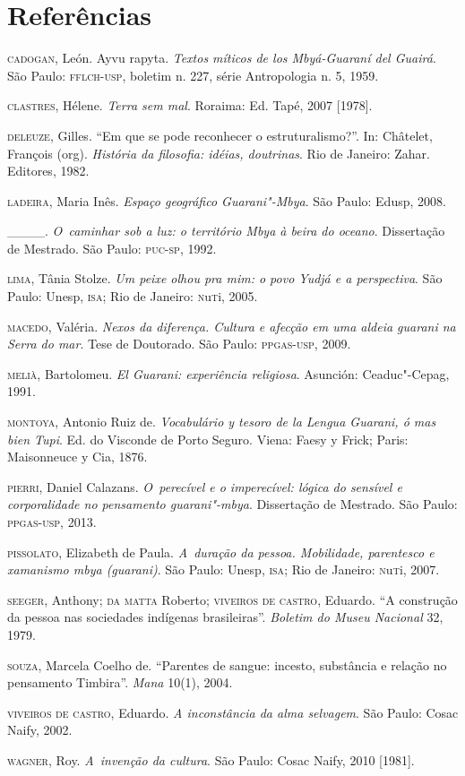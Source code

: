\section{Referências}

\begin{Parskip}
\textsc{cadogan}, León. Ayvu rapyta. \emph{Textos míticos de los Mbyá-Guaraní del
Guairá}. São Paulo: \textsc{fflch}-\textsc{usp}, boletim n. 227, série Antropologia n. 5,
1959.

\textsc{clastres}, Hélene. \emph{Terra sem mal}. Roraima: Ed. Tapé, 2007 [1978].

\textsc{deleuze}, Gilles. ``Em que se pode reconhecer o estruturalismo?''.
In: Châtelet, François (org). \emph{História da filosofia: idéias,
doutrinas}. Rio de Janeiro: Zahar. Editores, 1982.

\textsc{ladeira}, Maria Inês. \emph{Espaço geográfico Guarani"-Mbya}. São Paulo:
Edusp, 2008.

\_\_\_\_. \emph{O~caminhar sob a luz: o território Mbya à beira do oceano}. 
Dissertação de Mestrado. São Paulo: \textsc{puc}-\textsc{sp}, 1992.

\textsc{lima}, Tânia Stolze. \emph{Um peixe olhou pra mim: o povo Yudjá e a
perspectiva}. São Paulo: Unesp, \textsc{isa}; Rio de Janeiro: \textsc{n}u\textsc{t}i, 2005.

\textsc{macedo}, Valéria. \emph{Nexos da diferença. Cultura e afecção em uma
aldeia guarani na Serra do mar}. Tese de Doutorado. São Paulo:
\textsc{ppgas}-\textsc{usp}, 2009.

\textsc{melià}, Bartolomeu. \emph{El Guarani: experiência religiosa}. Asunción:
Ceaduc"-Cepag, 1991.

\textsc{montoya}, Antonio Ruiz de. \emph{Vocabulário y tesoro de la Lengua
Guarani, ó mas bien Tupi}. Ed. do Visconde de Porto Seguro. Viena: Faesy
y Frick; Paris: Maisonneuce y Cia, 1876.

\textsc{pierri}, Daniel Calazans. \emph{O~perecível e o imperecível: lógica do
sensível e corporalidade no pensamento guarani"-mbya}. Dissertação de
Mestrado. São Paulo: \textsc{ppgas}-\textsc{usp}, 2013.

\textsc{pissolato}, Elizabeth de Paula. \emph{A~duração da pessoa. Mobilidade,
parentesco e xamanismo mbya (guarani)}. São Paulo: Unesp, \textsc{isa}; Rio de
Janeiro: \textsc{n}u\textsc{t}i, 2007.

\textsc{seeger}, Anthony; \textsc{da matta} Roberto; \textsc{viveiros de castro}, Eduardo. ``A
construção da pessoa nas sociedades indígenas brasileiras''. \emph{Boletim do
Museu Nacional} 32, 1979. 

\textsc{souza}, Marcela Coelho de. ``Parentes de sangue: incesto, substância
e relação no pensamento Timbira''. \emph{Mana} 10(1), 2004.

\textsc{viveiros de castro}, Eduardo. \emph{A inconstância da alma selvagem}. São
Paulo: Cosac Naify, 2002.

\textsc{wagner}, Roy. \emph{A~invenção da cultura}. São Paulo: Cosac Naify, 2010
[1981].
\end{Parskip}

